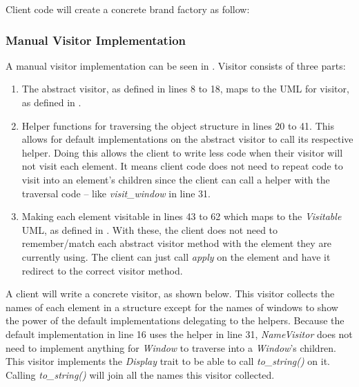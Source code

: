 Client code will create a concrete brand factory as follow:


\subsubsection{Manual Visitor Implementation}
\label{sec:visitor-manual-implementation}

A manual visitor implementation can be seen in .
Visitor consists of three parts:
\begin{enumerate}
	\item The abstract visitor, as defined in lines 8 to 18, maps to the UML for visitor, as defined in .
	\item Helper functions for traversing the object structure \cite{gamma_94_01} in lines 20 to 41.
	      This allows for default implementations on the abstract visitor to call its respective helper.
	      Doing this allows the client to write less code when their visitor will not visit each element.
	      It means client code does not need to repeat code to visit into an element's children since the client can call a helper with the traversal code -- like \textit{visit\_window} in line 31.
	\item Making each element visitable in lines 43 to 62 which maps to the \textit{Visitable} UML, as defined in .
	      With these, the client does not need to remember/match each abstract visitor method with the element they are currently using.
	      The client can just call \textit{apply} on the element and have it redirect to the correct visitor method.
\end{enumerate}

A client will write a concrete visitor, as shown below.
This visitor collects the names of each element in a structure except for the names of windows to show the power of the default implementations delegating to the helpers.
Because the default implementation in  line 16 uses the helper in line 31, \textit{NameVisitor} does not need to implement anything for \textit{Window} to traverse into a \textit{Window}'s children.
This visitor implements the \textit{Display} trait to be able to call \textit{to\_string()} on it.
Calling \textit{to\_string()} will join all the names this visitor collected.


